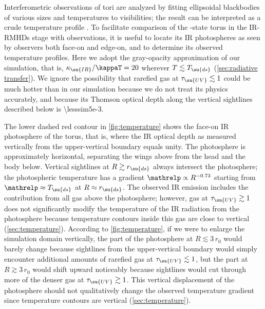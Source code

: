 \documentclass[twocolumn]{article}
\newcommand*\irrmhd{\ac{IR}\protect\nobreakdash-\acp{RMHD}}
\begin{document}
Interferometric observations of tori are analyzed by fitting ellipsoidal
blackbodies of various sizes and temperatures to visibilities; the result can
be interpreted as a crude temperature profile
\citep[e.g.,][]{2007A&A...474..837T}. To facilitate comparison of the
-state torus in the \irrmhd{} stage with observations, it is
useful to locate its \ac{IR} photospheres as seen by observers both face-on and
edge-on, and to determine its observed temperature profiles. Here we adopt the
gray-opacity approximation of our simulation, that is,
$\kappa_\su{IR}/\kappaT=20$ wherever $T\lesssim T_\su{ds}$ (\cref{sec:radiative
transfer}). We ignore the possibility that rarefied gas at
$\tau_\su{UV}\lesssim1$ could be much hotter than in our simulation because we
do not treat its physics accurately, and because its Thomson optical depth
along the vertical sightlines described below is \num{\lesssim5e-3}.

The lower dashed red contour in \cref{fig:temperature} shows the face-on
\ac{IR} photosphere of the torus, that is, where the \ac{IR} optical depth as
measured vertically from the upper-vertical boundary equals unity. The
photosphere is approximately horizontal, separating the wings above from the
head and the body below. Vertical sightlines at $R\gtrsim r_\su{ds}$ always
intersect the photosphere; the photospheric temperature has a gradient
$\mathrelp\propto R^{-0.73}$ starting from $\mathrelp\approx T_\su{ds}$ at
$R\approx r_\su{ds}$. The observed \ac{IR} emission includes the contribution
from all gas above the photosphere; however, gas at $\tau_\su{UV}\gtrsim1$ does
not significantly modify the temperature of the \ac{IR} radiation from the
photosphere because temperature contours inside this gas are close to vertical
(\cref{sec:temperature}). According to \cref{fig:temperature}, if we were to
enlarge the simulation domain vertically, the part of the photosphere at
$R\lesssim3\,r_0$ would barely change because sightlines from the
upper-vertical boundary would simply encounter additional amounts of rarefied
gas at $\tau_\su{UV}\lesssim1$, but the part at $R\gtrsim3\,r_0$ would shift
upward noticeably because sightlines would cut through more of the denser gas
at $\tau_\su{UV}\gtrsim1$. This vertical displacement of the photosphere should
not qualitatively change the observed temperature gradient since temperature
contours are vertical (\cref{sec:temperature}).
\end{document}
